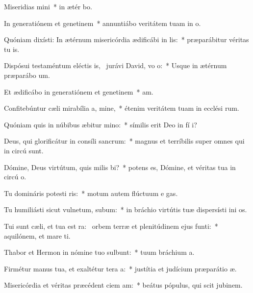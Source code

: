 \item Miseridias mini~* in ætér bo.
\item In generatiónem et genetinem~* annuntiábo veritátem tuam in  o.
\item Quóniam dixísti: In ætérnum misericórdia ædificábi in lis:~* præparábitur véritas tu  is.
\item Dispósui testaméntum eléctis is,~\pscross{} jurávi David, vo o:~* Usque in ætérnum præparábo  um.
\item Et ædificábo in generatiónem et genetinem~*  am.
\item Confitebúntur cæli mirabília a, mine,~* étenim veritátem tuam in ecclési rum.
\item Quóniam quis in núbibus æbitur mino:~* símilis erit Deo in fí i?
\item Deus, qui glorificátur in consíli sancrum:~* magnus et terríbilis super omnes qui in circú  sunt.
\item Dómine, Deus virtútum, quis milis bi?~* potens es, Dómine, et véritas tua in circú o.
\item Tu domináris potesti ris:~* motum autem flúctuum e  gas.
\item Tu humiliásti sicut vulnetum, subum:~* in bráchio virtútis tuæ dispersísti ini os.
\item Tui sunt cæli, et tua est ra:~\pscross{} orbem terræ et plenitúdinem ejus  funti:~* aquilónem, et mare  ti.
\item Thabor et Hermon in nómine tuo sulbunt:~* tuum bráchium  a.
\item Firmétur manus tua, et exaltétur tera a:~* justítia et judícium præparátio  æ.
\item Misericórdia et véritas præcédent ciem am:~* beátus pópulus, qui scit jubinem.
